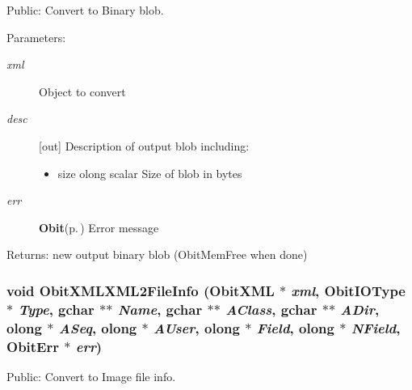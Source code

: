 Public: Convert to Binary blob. 

\begin{Desc}
\item[Parameters:]
\begin{description}
\item[{\em xml}]Object to convert \item[{\em desc}][out] Description of output blob including: \begin{itemize}
\item size olong scalar Size of blob in bytes \end{itemize}
\item[{\em err}]{\bf Obit}{\rm (p.\,\pageref{structObit})} Error message \end{description}
\end{Desc}
\begin{Desc}
\item[Returns:]new output binary blob (Obit\-Mem\-Free when done) \end{Desc}
\subsubsection{\setlength{\rightskip}{0pt plus 5cm}void Obit\-XMLXML2File\-Info ({\bf Obit\-XML} $\ast$ {\em xml}, Obit\-IOType $\ast$ {\em Type}, gchar $\ast$$\ast$ {\em Name}, gchar $\ast$$\ast$ {\em AClass}, gchar $\ast$$\ast$ {\em ADir}, {\bf olong} $\ast$ {\em ASeq}, {\bf olong} $\ast$ {\em AUser}, {\bf olong} $\ast$ {\em Field}, {\bf olong} $\ast$ {\em NField}, {\bf Obit\-Err} $\ast$ {\em err})}\label{ObitXML_8h_a27}


Public: Convert to Image file info. 

